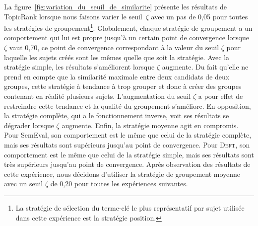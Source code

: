         La figure~\ref{fig:variation_du_seuil_de_similarite} présente les
        résultats de TopicRank lorsque nous faisons varier le seuil~$\zeta$ avec
        un pas de 0,05 pour toutes les stratégies de groupement\footnote{La
        stratégie de sélection du terme-clé le plus représentatif par sujet
        utilisée dans cette expérience est la stratégie position.}.
        Globalement, chaque stratégie de groupement a un comportement qui lui
        est propre jusqu'à un certain point de convergence lorsque $\zeta$ vaut
        0,70, ce point de convergence correspondant à la valeur du seuil $\zeta$
        pour laquelle les sujets créés sont les mêmes quelle que soit la
        stratégie. Avec la stratégie simple, les résultats s'améliorent lorsque
        $\zeta$ augmente. Du fait qu'elle ne prend en compte que la similarité
        maximale entre deux candidats de deux groupes, cette stratégie à
        tendance à trop grouper et donc à créer des groupes contenant en réalité
        plusieurs sujets. L'augmentation du seuil $\zeta$ a pour effet de
        restreindre cette tendance et la qualité du groupement s'améliore. En
        opposition, la stratégie complète, qui a le fonctionnement inverse, voit
        ses résultats se dégrader lorsque $\zeta$ augmente. Enfin, la stratégie
        moyenne agit en compromis. Pour SemEval, son comportement est le même
        que celui de la stratégie complète, mais ses résultats sont supérieurs
        jusqu'au point de convergence. Pour \textsc{Deft}, son comportement est
        le même que celui de la stratégie simple, mais ses résultats sont très
        supérieurs jusqu'au point de convergence.
        Après observation des résultats de cette expérience, nous décidons
        d'utiliser la stratégie de groupement moyenne avec un seuil $\zeta$ de
        0,20 pour toutes les expériences suivantes.

